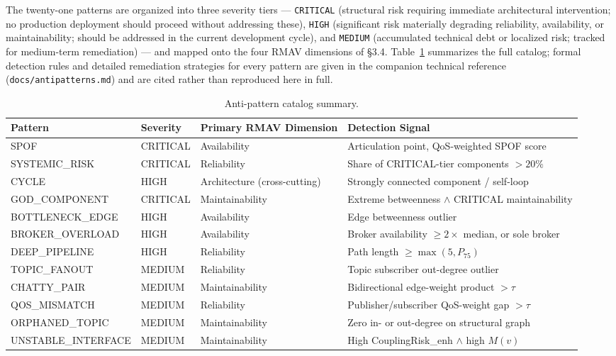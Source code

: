\documentclass[11pt]{article}
\begin{document}
The twenty-one patterns are organized into three severity tiers --- \texttt{CRITICAL} (structural risk
requiring immediate architectural intervention; no production deployment should proceed without
addressing these), \texttt{HIGH} (significant risk materially degrading reliability, availability, or
maintainability; should be addressed in the current development cycle), and \texttt{MEDIUM}
(accumulated technical debt or localized risk; tracked for medium-term remediation) --- and mapped
onto the four RMAV dimensions of \S3.4. Table~\ref{tab:catalog} summarizes the full catalog; formal
detection rules and detailed remediation strategies for every pattern are given in the companion
technical reference (\texttt{docs/antipatterns.md}) and are cited rather than reproduced here in full.

\begin{table}[htbp]
\centering
\caption{Anti-pattern catalog summary.}
\label{tab:catalog}
\begin{tabular}{@{}p{2.6cm}p{1.5cm}p{3.0cm}p{6.0cm}@{}}
\toprule
Pattern & Severity & Primary RMAV Dimension & Detection Signal \\
\midrule
SPOF & CRITICAL & Availability & Articulation point, QoS-weighted SPOF score \\
SYSTEMIC\_RISK & CRITICAL & Reliability & Share of CRITICAL-tier components $> 20\%$ \\
CYCLE & HIGH & Architecture (cross-cutting) & Strongly connected component / self-loop \\
GOD\_COMPONENT & CRITICAL & Maintainability & Extreme betweenness $\wedge$ CRITICAL maintainability \\
BOTTLENECK\_EDGE & HIGH & Availability & Edge betweenness outlier \\
BROKER\_OVERLOAD & HIGH & Availability & Broker availability $\ge 2\times$ median, or sole broker \\
DEEP\_PIPELINE & HIGH & Reliability & Path length $\ge \max(5, P_{75})$ \\
TOPIC\_FANOUT & MEDIUM & Reliability & Topic subscriber out-degree outlier \\
CHATTY\_PAIR & MEDIUM & Maintainability & Bidirectional edge-weight product $> \tau$ \\
QOS\_MISMATCH & MEDIUM & Reliability & Publisher/subscriber QoS-weight gap $> \tau$ \\
ORPHANED\_TOPIC & MEDIUM & Maintainability & Zero in- or out-degree on structural graph \\
UNSTABLE\_INTERFACE & MEDIUM & Maintainability & High CouplingRisk\_enh $\wedge$ high $M(v)$ \\

\end{tabular}
\end{table}
\end{document}
